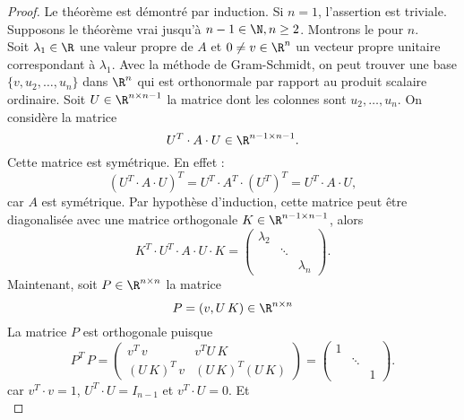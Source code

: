 \begin{proof}
  Le théorème est démontré par induction. Si $n=1$, l'assertion est triviale. \\
  Supposons le théorème vrai jusqu'à $n-1 \in \N, n \ge 2$. Montrons le pour $n$. \\
  Soit $\lambda_1 \in \R$
  une valeur propre de $A$
  et $0 \neq v \in \R^n$
  un vecteur propre unitaire correspondant à $\lambda_1$.
  Avec la méthode de Gram-Schmidt, on peut trouver une base
  $\{v,u_2,\dots,u_n\}$ dans $\R^n$ qui est orthonormale par rapport au produit scalaire ordinaire. Soit $U \in \R^{n \times n-1}$ la matrice dont les colonnes sont $u_2,\dots,u_n$.  On considère la matrice
  \begin{displaymath}
    U^T \cdot A \cdot U \in \R^{n-1 \times n-1}.
  \end{displaymath}
  Cette matrice est symétrique. En effet :
  \begin{displaymath}
    (U^T \cdot A \cdot U)^T = U^T \cdot A^T \cdot (U^T)^T = U^T \cdot A \cdot U,
  \end{displaymath}
  car $A$ est symétrique. Par hypothèse d'induction, cette matrice peut être diagonalisée  avec une matrice orthogonale  $K \in \R^{ n-1 \times n-1}$, alors 
  \begin{displaymath}
    K^T \cdot  U^T \cdot A \cdot U \cdot K =
    \begin{pmatrix}
      \lambda_2 \\
      & \ddots \\
      && \lambda_n
    \end{pmatrix}. 
  \end{displaymath}
Maintenant, soit $P \in \R^{n \times n}$ la matrice 
\begin{displaymath}
  P = \left( v, U\,K\right) \in \R^{n \times n}
\end{displaymath} 
La matrice $P$ est orthogonale puisque 
\begin{displaymath}
  P^T \, P =
  \begin{pmatrix}
    v^T \, v & v^T U \, K \\
    (U\,K)^T \, v &  (U\,K)^T (U\,K)
  \end{pmatrix} = 
  \begin{pmatrix}
    1 \\
    & \ddots \\
    && 1 
  \end{pmatrix}. 
\end{displaymath}
car $v^T \cdot v = 1$, $U^T \cdot U = I_{n-1}$ et $v^T \cdot U = 0$. Et 
\begin{displaymath}

\end{displaymath}
\end{proof}
